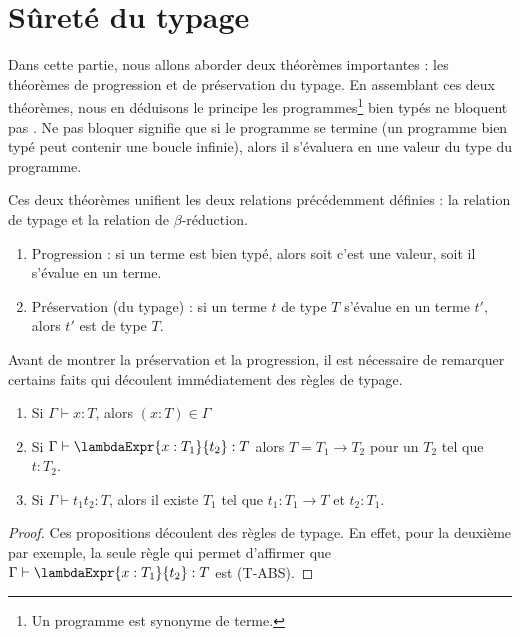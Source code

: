 \section{Sûreté du typage}

Dans cette partie, nous allons aborder deux théorèmes importantes : les
théorèmes de progression et de préservation du typage. En assemblant ces deux
théorèmes, nous en déduisons le principe \og les
programmes\footnote{Un programme est synonyme de terme.}
bien typés ne bloquent pas \fg. Ne pas bloquer signifie que si le programme se
termine (un programme bien typé peut contenir une boucle infinie), alors il
s'évaluera en une valeur du type du programme.

Ces deux théorèmes unifient les deux relations précédemment définies : la
relation de typage et la relation de $\beta$-réduction.

\begin{enumerate}
  \item Progression : si un terme est bien typé, alors soit c'est une
    valeur, soit il s'évalue en un terme.
    \item Préservation (du typage) : si un terme $t$ de type $T$ s'évalue en un terme $t'$,
      alors $t'$ est de type $T$.
\end{enumerate}

Avant de montrer la préservation et la progression, il est nécessaire de
remarquer certains faits qui découlent immédiatement des règles de typage.

\begin{lemma} 
  \label{lemma:simply-typed-lambda-calculus-inversion}
  \begin{enumerate}
    \item Si $\Gamma \vdash x : T$, alors $(x : T) \in \Gamma$
    \item Si $\Gamma \vdash \lambdaExpr{x : T_{1}}{t_{2}} : T$ alors $T = T_{1}
      \rightarrow T_{2}$ pour un $T_{2}$ tel que $t : T_{2}$.
    \item Si $\Gamma \vdash t_{1} t_{2} : T$, alors il existe $T_{1}$
      tel que $t_{1} : T_{1} \rightarrow T$ et $t_{2} : T_{1}$.
  \end{enumerate}
\end{lemma}
  
\begin{proof}
  \label{proof:simply-typed-lambda-calculus-inversion}
  Ces propositions découlent des règles de typage. En effet, pour la deuxième
  par exemple, la seule règle qui permet d'affirmer que $\Gamma \vdash
  \lambdaExpr{x : T_{1}}{t_{2}} : T$ est (T-ABS).
\end{proof}

